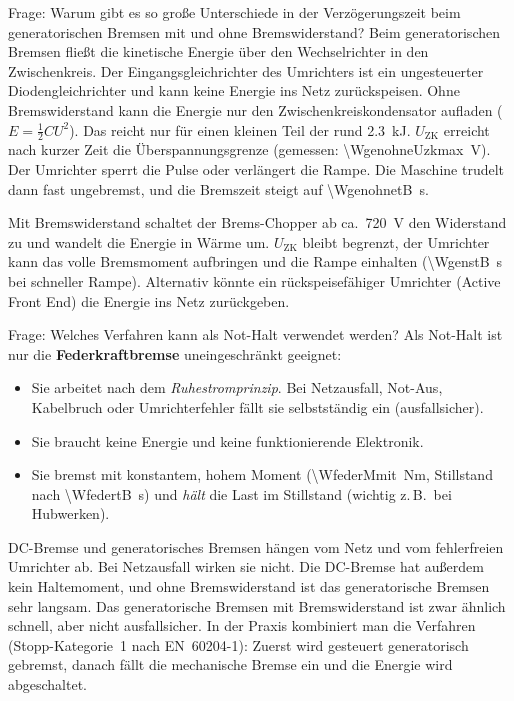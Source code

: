 \documentclass[11pt,a4paper]{article}
\begin{document}
\begin{antwort}{Frage: Warum gibt es so große Unterschiede in der Verzögerungszeit beim generatorischen Bremsen mit und ohne Bremswiderstand?}
Beim generatorischen Bremsen fließt die kinetische Energie über den Wechselrichter in den
Zwischenkreis. Der Eingangsgleichrichter des Umrichters ist ein ungesteuerter Diodengleichrichter
und kann keine Energie ins Netz zurückspeisen. Ohne Bremswiderstand kann die Energie nur den
Zwischenkreiskondensator aufladen ($E=\tfrac12 C U^2$). Das reicht nur für einen kleinen Teil
der rund \SI{2,3}{kJ}. $U_\mathrm{ZK}$ erreicht nach kurzer Zeit die Überspannungsgrenze
(gemessen: \SI{\WgenohneUzkmax}{V}). Der Umrichter sperrt die Pulse oder verlängert die
Rampe. Die Maschine trudelt dann fast ungebremst, und die Bremszeit steigt auf
\SI{\WgenohnetB}{s}.

Mit Bremswiderstand schaltet der Brems-Chopper ab ca.\ \SI{720}{V} den Widerstand zu und
wandelt die Energie in Wärme um. $U_\mathrm{ZK}$ bleibt begrenzt, der Umrichter kann das
volle Bremsmoment aufbringen und die Rampe einhalten (\SI{\WgenstB}{s} bei schneller Rampe).
Alternativ könnte ein rückspeisefähiger Umrichter (Active Front End) die Energie ins Netz zurückgeben.
\end{antwort}

\begin{antwort}{Frage: Welches Verfahren kann als Not-Halt verwendet werden?}
Als Not-Halt ist nur die \textbf{Federkraftbremse} uneingeschränkt geeignet:
\begin{itemize}
\item Sie arbeitet nach dem \emph{Ruhestromprinzip}. Bei Netzausfall, Not-Aus,
      Kabelbruch oder Umrichterfehler fällt sie selbstständig ein (ausfallsicher).
\item Sie braucht keine Energie und keine funktionierende Elektronik.
\item Sie bremst mit konstantem, hohem Moment (\SI{\WfederMmit}{Nm}, Stillstand nach
      \SI{\WfedertB}{s}) und \emph{hält} die Last im Stillstand (wichtig z.\,B.\ bei
      Hubwerken).
\end{itemize}
DC-Bremse und generatorisches Bremsen hängen vom Netz und vom fehlerfreien Umrichter ab. Bei
Netzausfall wirken sie nicht. Die DC-Bremse hat außerdem kein Haltemoment, und ohne
Bremswiderstand ist das generatorische Bremsen sehr langsam. Das generatorische Bremsen mit
Bremswiderstand ist zwar ähnlich schnell, aber nicht ausfallsicher. In der Praxis kombiniert man
die Verfahren (Stopp-Kategorie~1 nach EN~60204-1): Zuerst wird gesteuert generatorisch gebremst,
danach fällt die mechanische Bremse ein und die Energie wird abgeschaltet.
\end{antwort}
\end{document}
